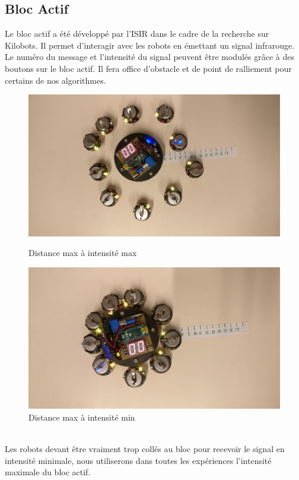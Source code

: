 \documentclass[a4paper]{article}
\begin{document}
\subsection{Bloc Actif}
Le bloc actif a été développé par l'ISIR dans le cadre de la recherche sur Kilobots. Il permet d'interagir avec les robots en émettant un signal infrarouge. Le numéro du message et l'intensité du signal peuvent être modulés grâce à des boutons sur le bloc actif. Il fera office d'obstacle et de point de ralliement pour certains de nos algorithmes.\\
\begin{figure}[h]
	\begin{minipage}[c]{.46\linewidth}
		\centering
		\includegraphics[width=1.1\linewidth]{../../script_results/bloc_actif_max.jpg}
		\caption{Distance max à intensité max}
	\end{minipage}
	\hfill%
	\begin{minipage}[c]{.46\linewidth}
		\centering
		\includegraphics[width=1.1\linewidth]{../../script_results/bloc_actif_min.jpg}
		\caption{Distance max à intensité min}
	\end{minipage}
\end{figure}
\\
Les robots devant être vraiment trop collés au bloc pour recevoir le signal en intensité minimale, nous utiliserons dans toutes les expériences l'intensité maximale du bloc actif.
\end{document}
